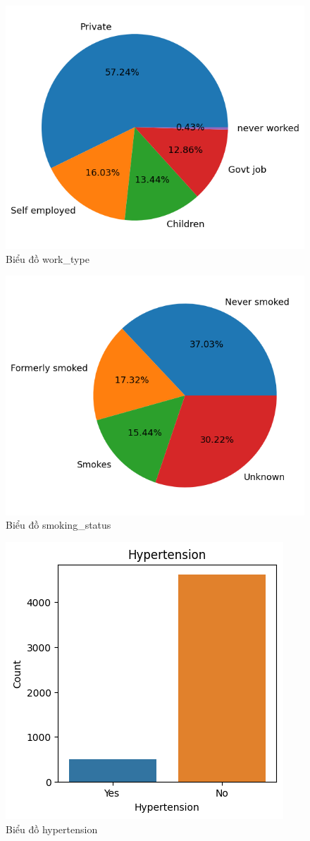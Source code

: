 \documentclass[11pt]{article}
\begin{document}
	 \begin{figure}[H]
	 	\centering
	 	\includegraphics[width=0.5\linewidth]{workedPie}
	 	\caption{Biểu đồ work\_type}
	 	\label{fig:workedpie}
	 \end{figure}
	 
	 \begin{figure}[H]
	 	\centering
	 	\includegraphics[width=0.5\linewidth]{smokingPie}
	 	\caption{Biểu đồ smoking\_status}
	 	\label{fig:smokingpie}
	 \end{figure}
	 
	 \begin{figure}[H]
	 	\centering
	 	\includegraphics[width=0.5\linewidth]{hypertensionChart}
	 	\caption{Biểu đồ hypertension}
	 	\label{fig:hypertensionchart}
	 \end{figure}
	 
\end{document}
